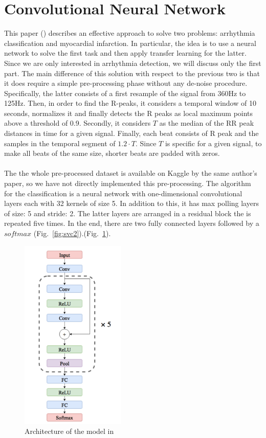 \documentclass[LaM,binding=0.6cm]{sapthesis}
\begin{document}
\section{Convolutional Neural Network  \cite{cnnfazeli}}
This paper (\cite{cnnfazeli}) describes an effective approach to solve two problems: arrhythmia classification and myocardial infarction. In particular, the idea is to use a neural network to solve the first task and then apply transfer learning for the latter. Since we are only interested in arrhythmia detection, we will discuss only the first part. The main difference of this solution with respect to the previous two is that it does require a simple pre-processing phase without any de-noise procedure. Specifically, the latter consists of a first resample of the signal from 360Hz to 125Hz. Then, in order to find the R-peaks, it considers a temporal window of 10 seconds, normalizes it and finally detects the R peaks as local maximum points above a threshold of 0.9. Secondly, it considers $T$ as the median of the RR peak distances in time for a given signal. Finally, each beat consists of R peak and the samples in the temporal segment of $1.2 \cdot T$. Since $T$ is specific for a given signal, to make all beats of the same size, shorter beats are padded with zeros.\\\\The the whole pre-processed dataset is available on Kaggle by the same author's paper, so we have not directly implemented this pre-processing. The algorithm for the classification is a neural network with one-dimensional convolutional layers each with 32 kernels of size 5. In addition to this, it has max polling layers of size: 5 and stride: 2. The latter layers are arranged in a residual block the is repeated five times. In the end, there are two fully connected layers followed by a $softmax$ (Fig.~\ref{fig:svc2}).(Fig.~\ref{fig:arch-cnn}).
\begin{figure}  \centering
    \includegraphics[width=50mm,scale=0.7]{arch-cnn}
    \caption{Architecture of the model in \cite{cnnfazeli}}
    \label{fig:arch-cnn}
\end{figure}
\end{document}
